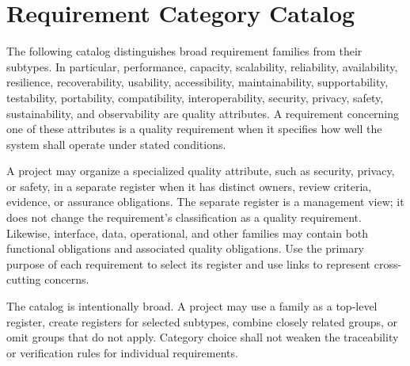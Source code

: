 \section{Requirement Category Catalog}
The following catalog distinguishes broad requirement families from their
subtypes. In particular, performance, capacity, scalability, reliability,
availability, resilience, recoverability, usability, accessibility,
maintainability, supportability, testability, portability, compatibility,
interoperability, security, privacy, safety, sustainability, and observability
are quality attributes. A requirement concerning one of these attributes is a
quality requirement when it specifies how well the system shall operate under
stated conditions.

A project may organize a specialized quality attribute, such as security,
privacy, or safety, in a separate register when it has distinct owners, review
criteria, evidence, or assurance obligations. The separate register is a
management view; it does not change the requirement's classification as a
quality requirement. Likewise, interface, data, operational, and other families
may contain both functional obligations and associated quality obligations. Use
the primary purpose of each requirement to select its register and use links to
represent cross-cutting concerns.

The catalog is intentionally broad. A project may use a family as a top-level
register, create registers for selected subtypes, combine closely related
groups, or omit groups that do not apply. Category choice shall not weaken the
traceability or verification rules for individual requirements.

